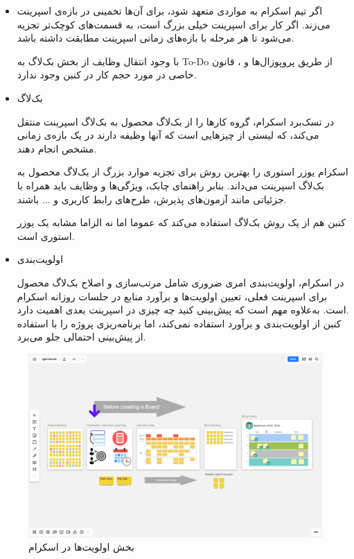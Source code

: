 {\begin{itemize}
\item اگر تیم اسکرام به مواردی متعهد شود، برای آن‌ها تخمینی در بازه‌ی اسپرینت می‌زند. اگر کار برای اسپرینت خیلی بزرگ است، به قسمت‌های کوچک‌تر تجزیه می‌شود تا هر مرحله با بازه‌های زمانی اسپرینت مطابقت داشته باشد.

با وجود انتقال وظایف از بخش بک‌لاگ به To-Do از طریق پروپوزال‌ها و ، قانون خاصی در مورد حجم کار در کنبن وجود ندارد.


\item بک‌لاگ

در تسک‌برد اسکرام، گروه کار‌ها را از بک‌لاگ محصول به بک‌لاگ اسپرینت منتقل می‌کند، که لیستی از چیزهایی است که آنها وظیفه دارند در یک بازه‌ی زمانی مشخص انجام دهند.

اسکرام یوزر استوری را بهترین روش برای تجزیه موارد بزرگ از بک‌لاگ محصول به بک‌لاگ اسپرینت می‌داند. بنابر راهنمای چابک، ویژگی‌ها و وظایف باید همراه با جزئیاتی مانند آزمون‌های پذیرش، طرح‌های رابط کاربری و ... باشند.

کنبن هم از یک روش بک‌لاگ استفاده می‌کند که عموما اما نه الزاما مشابه یک یوزر استوری است.


\item اولویت‌بندی

در اسکرام، اولویت‌بندی امری ضروری شامل مرتب‌سازی و اصلاح بک‌لاگ محصول برای اسپرینت فعلی، تعیین اولویت‌ها و برآورد منابع در جلسات روزانه اسکرام است. به‌علاوه مهم است که پیش‌بینی کنید چه چیزی در اسپرینت بعدی اهمیت دارد. \\
کنبن از اولویت‌بندی و برآورد استفاده نمی‌کند، اما برنامه‌ریزی پروژه را با استفاده از پیش‌بینی احتمالی جلو می‌برد. 
\end{itemize}
    
\begin{figure}
	\centering
	\includegraphics[scale=0.3]{figs/4-2-c}
	\caption{بخش اولویت‌ها در اسکرام}
\end{figure}

}
